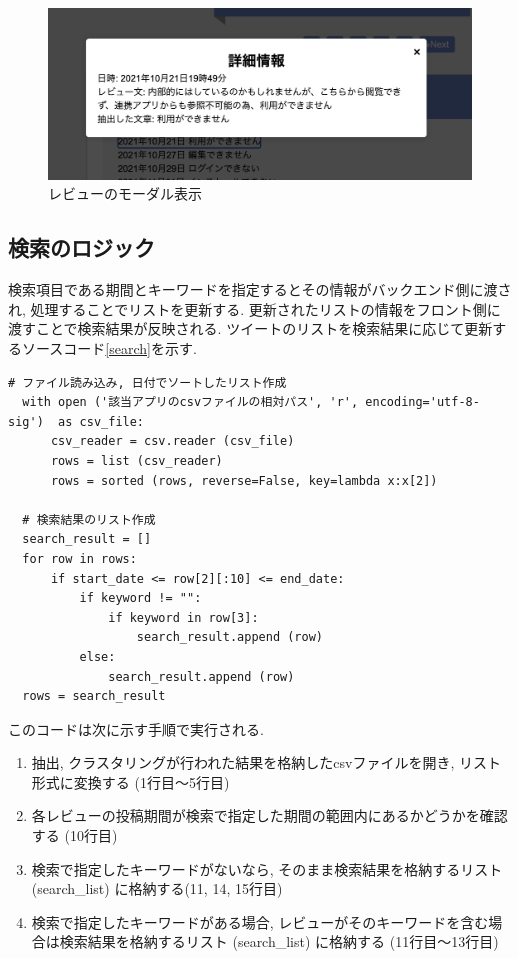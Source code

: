 \begin{figure}[H]
  \centering
  \includegraphics[scale=0.5]
    {contents/images/modal.png}
  \caption{レビューのモーダル表示\label{fig:modal}}
\end{figure}

\subsection{検索のロジック}
検索項目である期間とキーワードを指定するとその情報がバックエンド側に渡され, 処理することでリストを更新する. 更新されたリストの情報をフロント側に渡すことで検索結果が反映される. 
ツイートのリストを検索結果に応じて更新するソースコード\ref{search}を示す. 

\begin{lstlisting}[caption=view.py, label=search]
  # ファイル読み込み, 日付でソートしたリスト作成
  with open ('該当アプリのcsvファイルの相対パス', 'r', encoding='utf-8-sig')  as csv_file:
      csv_reader = csv.reader (csv_file) 
      rows = list (csv_reader) 
      rows = sorted (rows, reverse=False, key=lambda x:x[2]) 

  # 検索結果のリスト作成
  search_result = []
  for row in rows:
      if start_date <= row[2][:10] <= end_date:
          if keyword != "":
              if keyword in row[3]:
                  search_result.append (row) 
          else:
              search_result.append (row) 
  rows = search_result
\end{lstlisting}

このコードは次に示す手順で実行される. 

\begin{enumerate}
  \item 抽出, クラスタリングが行われた結果を格納したcsvファイルを開き, リスト形式に変換する (1行目〜5行目)
  \item 各レビューの投稿期間が検索で指定した期間の範囲内にあるかどうかを確認する (10行目)
  \item 検索で指定したキーワードがないなら, そのまま検索結果を格納するリスト (search\_list) に格納する(11, 14, 15行目)
  \item 検索で指定したキーワードがある場合, レビューがそのキーワードを含む場合は検索結果を格納するリスト (search\_list) に格納する (11行目〜13行目)
\end{enumerate}

